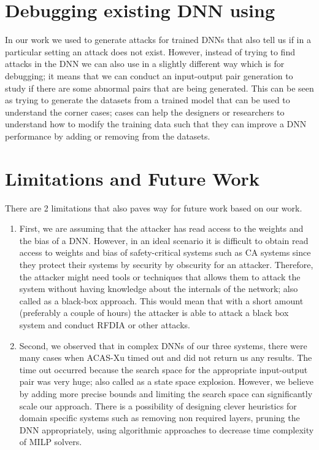 \section{Debugging existing DNN using \tool}
In our work we used \tool to generate attacks for trained \ac{DNN}s that also tell us if in a particular setting an attack does not exist. 
However, instead of trying to find attacks in the \ac{DNN} we can also use \tool in a slightly different way which is for debugging; it means that we can conduct an input-output pair generation to study if there are some abnormal pairs that are being generated. 
This can be seen as trying to generate the datasets from a trained model that can be used to understand the corner cases; cases can help the designers or researchers to understand how to modify the training data such that they can improve a \ac{DNN} performance by adding or removing from the datasets. 







\section{ Limitations  and Future Work}

There are 2 limitations that also paves way for future work based on our work. 
\begin{enumerate}
	\item First, we are assuming that the attacker has read access to the weights and the bias of a \ac{DNN}.
	However, in an ideal scenario it is difficult to obtain read access to weights and bias of safety-critical systems such as \ac{CA} systems since they protect their systems by security by obscurity for an attacker. 
	Therefore, the attacker might need tools or techniques that allows them to attack the system without having knowledge about the internals of the network; also called as a black-box approach. 
	This would mean that with a short amount (preferably a couple of hours) the attacker is able to attack a black box system and conduct \ac{RFDIA} or other attacks. 
	\item Second, we observed that in complex \ac{DNN}s of our three systems, there were many cases when  \ac{ACAS-Xu} timed out and did not return us any results. 
	The time out occurred because the search space for the appropriate input-output pair was very huge; also called as a state space explosion. 
	However, we believe by adding more precise bounds and limiting the search space can significantly scale our approach. 
	There is a possibility of designing clever heuristics for domain specific systems such as removing non required layers, pruning the \ac{DNN} appropriately, using algorithmic approaches to decrease time complexity of \ac{MILP} solvers. 
	
	\label{section:limitations}
	
\end{enumerate}




